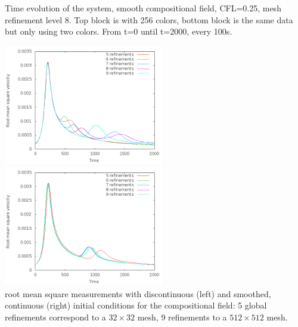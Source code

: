 \begin{itemize}
\begin{center}
{\captionfont Time evolution of the system, smooth compositional field, CFL=0.25, 
mesh refinement level 8. Top block is with 256 colors, bottom block is the same data 
but only using two colors. From t=0 until t=2000, every 100s.}
\end{center}


\begin{center}
\includegraphics[width=7cm]{images/benchmark_vaks97/aspect/velocity-discontinuous}
\includegraphics[width=7cm]{images/benchmark_vaks97/aspect/velocity-smooth}\\
{\captionfont 
root mean square measurements with discontinuous (left) and smoothed, continuous 
(right) initial conditions
for the compositional field: 5 global refinements correspond to a $32\times  32$ mesh,
9 refinements to a $512 \times 512$ mesh.}
\end{center}


\end{itemize}
